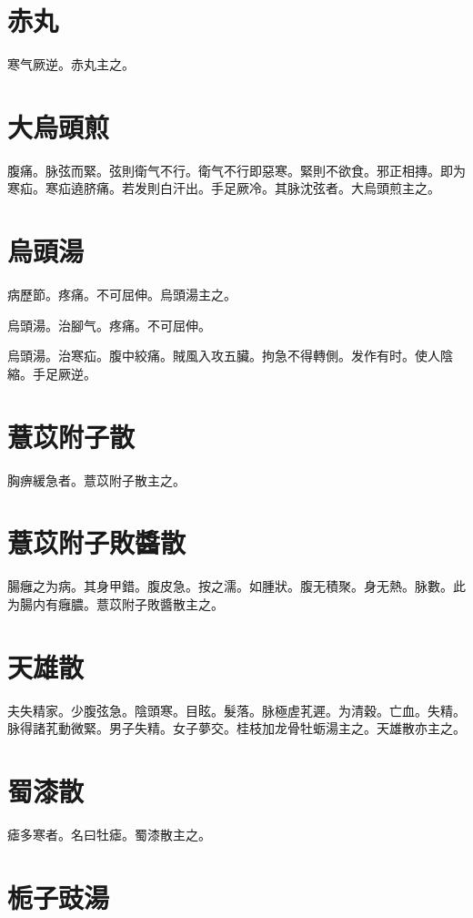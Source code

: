 \documentclass[12pt,twoside,UTF8,b5paper]{ctexbook}
\begin{document}
\section{赤丸}

寒气厥逆。赤丸主之。

\section{大烏頭煎}

腹痛。脉弦而緊。弦則衛气不行。{衛气不行}即惡寒。緊則不欲食。邪正相摶。即为寒疝。寒疝遶脐痛。若发則白汗出。手足厥冷。其脉沈弦者。大烏頭煎主之。

\section{烏頭湯}

病歷節。疼痛。不可屈伸。烏頭湯主之。

烏頭湯。治腳气。疼痛。不可屈伸。

烏頭湯。治寒疝。腹中絞痛。賊風入攻五臟。拘急不得轉側。发作有时。使人陰縮。手足厥逆。

\section{薏苡附子散}

胸痹緩急者。薏苡附子散主之。

\section{薏苡附子敗醬散}

腸癰之为病。其身甲錯。腹皮急。按之濡。如腫狀。腹无積聚。身无熱。脉數。此为腸内有癰膿。薏苡附子敗醬散主之。

\section{天雄散}

夫失精家。少腹弦急。陰頭寒。目眩。髮落。脉極虗芤遲。为清穀。亡血。失精。脉得諸芤動微緊。男子失精。女子夢交。桂枝加龙骨牡蛎湯主之。天雄散亦主之。

\section{蜀漆散}

瘧多寒者。名曰牡瘧。蜀漆散主之。

\section{栀子豉湯}
\end{document}
